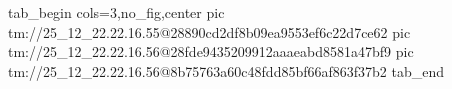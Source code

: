  
 
 
 
 

\qqSecOrig


\ifcmt
  tab_begin cols=3,no_fig,center
    pic tm://25_12_22.22.16.55@28890cd2df8b09ea9553ef6c22d7ce62
    pic tm://25_12_22.22.16.56@28fde9435209912aaaeabd8581a47bf9
    pic tm://25_12_22.22.16.56@8b75763a60c48fdd85bf66af863f37b2
  tab_end
\fi

